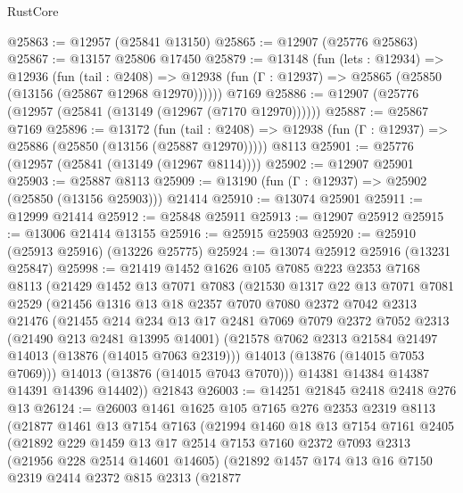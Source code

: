 \begin{lexlean}{RustCore}
\begin{coremodule}
@25863 := @12957 (@25841 @13150)
@25865 := @12907 (@25776 @25863)
@25867 := @13157 @25806 @17450
@25879 := @13148
    (fun (lets : @12934) =>
    @12936
      (fun (tail : @2408) =>
      @12938 (fun (Γ : @12937) => @25865 (@25850 (@13156 (@25867 @12968 @12970))))))
    @7169
@25886 := @12907 (@25776 (@12957 (@25841 (@13149 (@12967 (@7170 @12970))))))
@25887 := @25867 @7169
@25896 := @13172
    (fun (tail : @2408) => @12938 (fun (Γ : @12937) => @25886 (@25850 (@13156 (@25887 @12970)))))
    @8113
@25901 := @25776 (@12957 (@25841 (@13149 (@12967 @8114))))
@25902 := @12907 @25901
@25903 := @25887 @8113
@25909 := @13190 (fun (Γ : @12937) => @25902 (@25850 (@13156 @25903))) @21414
@25910 := @13074 @25901
@25911 := @12999 @21414
@25912 := @25848 @25911
@25913 := @12907 @25912
@25915 := @13006 @21414 @13155
@25916 := @25915 @25903
@25920 := @25910 (@25913 @25916) (@13226 @25775)
@25924 := @13074 @25912 @25916 (@13231 @25847)
@25998 := @21419
    @1452
    @1626
    @105
    @7085
    @223
    @2353
    @7168
    @8113
    (@21429
      @1452
      @13
      @7071
      @7083
      (@21530
        @1317
        @22
        @13
        @7071
        @7081
        @2529
        (@21456
          @1316
          @13
          @18
          @2357
          @7070
          @7080
          @2372
          @7042
          @2313
          @21476
          (@21455
            @214
            @234
            @13
            @17
            @2481
            @7069
            @7079
            @2372
            @7052
            @2313
            (@21490 @213 @2481 @13995 @14001)
            (@21578 @7062 @2313 @21584 @21497 @14013 (@13876 (@14015 @7063 @2319)))
            @14013
            (@13876 (@14015 @7053 @7069)))
          @14013
          (@13876 (@14015 @7043 @7070)))
        @14381
        @14384
        @14387
        @14391
        @14396
        @14402))
    @21843
@26003 := @14251 @21845 @2418 @2418 @276 @13
@26124 := @26003
    @1461
    @1625
    @105
    @7165
    @276
    @2353
    @2319
    @8113
    (@21877
      @1461
      @13
      @7154
      @7163
      (@21994
        @1460
        @18
        @13
        @7154
        @7161
        @2405
        (@21892
          @229
          @1459
          @13
          @17
          @2514
          @7153
          @7160
          @2372
          @7093
          @2313
          (@21956 @228 @2514 @14601 @14605)
          (@21892
            @1457
            @174
            @13
            @16
            @7150
            @2319
            @2414
            @2372
            @815
            @2313
            (@21877

\end{coremodule}
\end{lexlean}
